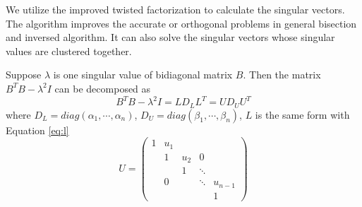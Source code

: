 We utilize the improved twisted factorization to calculate the singular vectors.
The algorithm improves the accurate or orthogonal problems in general bisection and inversed algorithm.
It can also solve the singular vectors whose singular values are clustered together.

Suppose $\lambda$ is one singular value of bidiagonal matrix $B$.
Then the matrix $B^T B - \lambda^2 I$ can be decomposed as
\begin{equation}
B^T B - \lambda^2 I = L D_L L^T = U D_U U^T
\end{equation}
where $D_L=diag(\alpha_1, \cdots, \alpha_n)$, $D_U = diag(\beta_1, \cdots, \beta_n)$, $L$ is the same form with Equation \ref{eq:l}
\begin{equation}
 U =  \left( \begin{array}{ccccc}
  1 & u_{1}&       &       &  \\
    & 1    & u_{2} & 0     &  \\
    &      & 1     & \ddots&  \\
    & 0    &       & \ddots& u_{n-1} \\
    &      &       &       & 1
 \end{array} \right)
\end{equation}

